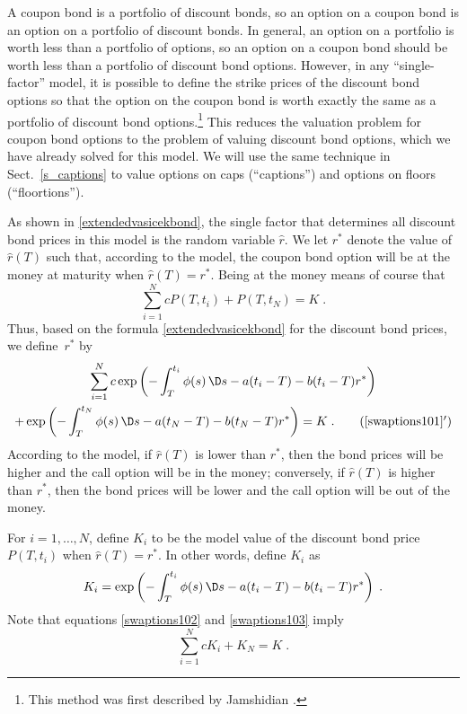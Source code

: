 A coupon bond is a portfolio of discount bonds, so an option on a coupon bond is an option on a portfolio of discount bonds.  In general, an option on a portfolio is worth less than a portfolio of options, so an option on a coupon bond should be worth less than a portfolio of discount bond options.  However, in any ``single-factor'' model, it is possible to define the strike prices of the discount bond options so that the option on the coupon bond is worth exactly the same as a portfolio of discount bond options.\footnote{This method was first described by Jamshidian \cite{Jamshidian89}.}  This reduces the valuation problem for coupon bond options to the problem of valuing discount bond options, which we have already solved for this model.  We will use the same technique in Sect.~\ref{s_captions} to value options on caps (``captions'') and options on floors (``floortions'').

As shown in  \eqref{extendedvasicekbond}, the single factor that determines all discount bond prices in this model is the random variable $\hat{r}$.  We let $r^*$ denote the value of~$\hat{r}(T)$ such that, according to the model, the coupon bond option will be at the money at maturity when $\hat{r}(T)=r^*$.  Being at the money means of course that
\begin{equation}\label{swaptions101}
\sum_{i=1}^N cP(T,t_i) + P(T,t_N) = K\;.
\end{equation}
Thus, based on the formula \eqref{extendedvasicekbond} for the discount bond prices, we define~$r^*$ by
\begin{multline}\label{swaptions102}
\sum_{i=1}^N c\exp\left(-\int_T^{t_i} \phi(s)\,\D s-a(t_i-T)-b(t_i-T)r^*\right) \\+ \exp\left(-\int_T^{t_N} \phi(s)\,\D s-a(t_N-T)-b(t_N-T)r^*\right) = K\;. \tag{\ref{swaptions101}$'$}
\end{multline}
According to the model, if $\hat{r}(T)$ is lower than $r^*$, then the bond prices will be higher and the call option will be in the money; conversely, if $\hat{r}(T)$ is higher than $r^*$, then the bond prices will be lower and the call option will be out of the money.  

For $i=1,\ldots,N$, define $K_i$ to be the model value of the discount bond price $P(T,t_i)$ when $\hat{r}(T)=r^*$.  In other words, define $K_i$ as 
\begin{equation}\label{swaptions103}
K_i = \exp\left(-\int_T^{t_i} \phi(s)\,\D s-a(t_i-T)-b(t_i-T)r^*\right)\;.
\end{equation}
Note that equations \eqref{swaptions102} and \eqref{swaptions103} imply
\begin{equation}\label{swaption100000}
\sum_{i=1}^N cK_i + K_N = K\; .
\end{equation}

